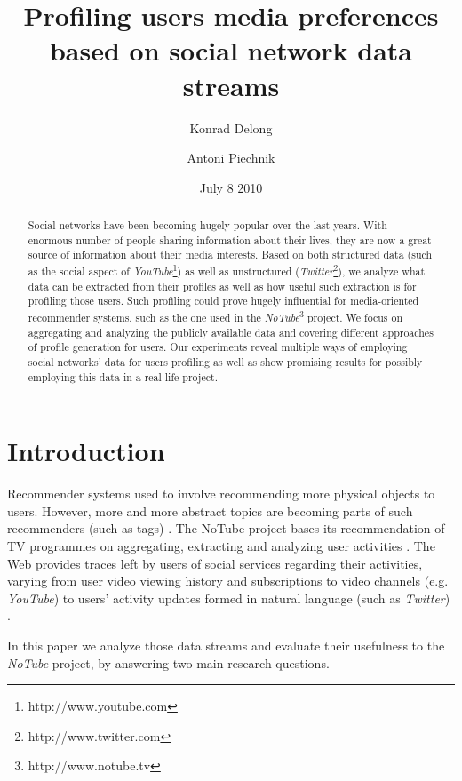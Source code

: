 \documentclass{article}
\begin{document}
\title{\textbf{Profiling users media preferences based on social network data streams}}
\author{Konrad Delong \and Antoni Piechnik}
\date{July 8 2010}

\maketitle

\begin{abstract} Social networks have been becoming hugely popular over the last
years. With enormous number of people sharing information about their lives,
they are now a great source of information about their media interests. Based on both
structured data (such as the social aspect of \textit{YouTube}\footnote[1]{http://www.youtube.com}) as well as unstructured
(\textit{Twitter}\footnote[2]{http://www.twitter.com}), we analyze what data can be extracted from their profiles as well as
how useful such extraction is for profiling those users. Such profiling could
prove hugely influential for media-oriented recommender systems, such as the one
used in the \textit{NoTube}\footnote[3]{http://www.notube.tv} project.
We focus on aggregating and analyzing the publicly available data and covering
different approaches of profile generation
for users. Our experiments reveal multiple ways of employing social networks'
data for users profiling as well as show promising results for possibly employing
this data in a real-life project.
\end{abstract}

\section{Introduction}

Recommender systems used to involve recommending more physical objects \cite{combining-cf-with-pa} to users.
However, more and more abstract topics are becoming parts of such recommenders (such as tags) \cite{accuracy-recommending}. The NoTube project bases its recommendation of TV programmes on aggregating,
extracting and analyzing user activities \cite{notube-main}. The Web provides traces left by users
of social services regarding their activities, varying from user video viewing history
and subscriptions to video channels (e.g. \textit{YouTube})
to users' activity updates formed in natural language (such as \textit{Twitter}) \cite{why-we-twitter}.

In this paper we analyze those data streams and evaluate their usefulness to the \textit{NoTube}
project, by answering two main research questions.
\end{document}
